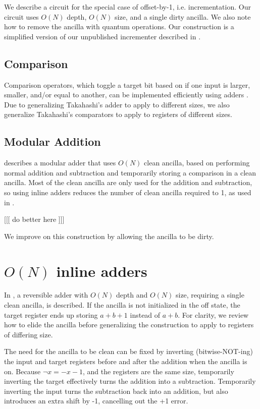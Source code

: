 \documentclass[twocolumn]{article}
\begin{document}
We describe a circuit for the special case of offset-by-1, i.e. incrementation.
Our circuit uses $O(N)$ depth, $O(N)$ size, and a single dirty ancilla.
We also note how to remove the ancilla with quantum operations.
Our construction is a simplified version of our unpublished incrementer described in \cite{gidney2015}.

\subsection{Comparison}

Comparison operators, which toggle a target bit based on if one input is larger, smaller, and/or equal to another, can be implemented efficiently using adders \cite{takahashi2005}.
Due to generalizing Takahashi's adder \cite{takahashi2005} to apply to different sizes, we also generalize Takahashi's comparators to apply to registers of different sizes.

\subsection{Modular Addition}

\cite{vedral1995} describes a modular adder that uses $O(N)$ clean ancilla, based on performing normal addition and subtraction and temporarily storing a comparison in a clean ancilla.
Most of the clean ancilla are only used for the addition and subtraction, so using inline adders reduces the number of clean ancilla required to 1, as used in \cite{haner2016}.

[[[ do better here ]]]

We improve on this construction by allowing the ancilla to be dirty.

\section{$O(N)$ inline adders} \label{sec:first-circuit}

In \cite{van2004}, a reversible adder with $O(N)$ depth and $O(N)$ size, requiring a single clean ancilla, is described.
If the ancilla is not initialized in the off state, the target register ends up storing $a+b+1$ instead of $a+b$.
For clarity, we review how to elide the ancilla before generalizing the construction to apply to registers of differing size.

The need for the ancilla to be clean can be fixed by inverting (bitwise-NOT-ing) the input and target registers before and after the addition when the ancilla is on.
Because $\lnot x = -x-1$, and the registers are the same size, temporarily inverting the target effectively turns the addition into a subtraction.
Temporarily inverting the input turns the subtraction back into an addition, but also introduces an extra shift by -1, cancelling out the +1 error.
\end{document}
